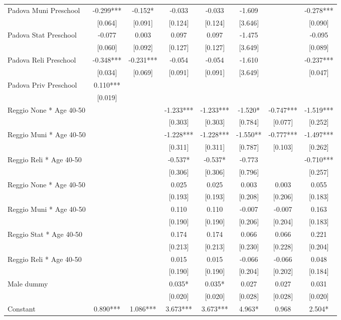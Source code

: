 \begin{tabular}{lccccccc}
Padova Muni Preschool & -0.299*** & -0.152* & -0.033 & -0.033 & -1.609 &  & -0.278*** \\
 & [0.064] & [0.091] & [0.124] & [0.124] & [3.646] &  & [0.090] \\
Padova Stat Preschool & -0.077 & 0.003 & 0.097 & 0.097 & -1.475 &  & -0.095 \\
 & [0.060] & [0.092] & [0.127] & [0.127] & [3.649] &  & [0.089] \\
Padova Reli Preschool & -0.348*** & -0.231*** & -0.054 & -0.054 & -1.610 &  & -0.237*** \\
 & [0.034] & [0.069] & [0.091] & [0.091] & [3.649] &  & [0.047] \\
Padova Priv Preschool & 0.110*** &  &  &  &  &  &  \\
 & [0.019] &  &  &  &  &  &  \\
Reggio None * Age 40-50 &  &  & -1.233*** & -1.233*** & -1.520* & -0.747*** & -1.519*** \\
 &  &  & [0.303] & [0.303] & [0.784] & [0.077] & [0.252] \\
Reggio Muni * Age 40-50 &  &  & -1.228*** & -1.228*** & -1.550** & -0.777*** & -1.497*** \\
 &  &  & [0.311] & [0.311] & [0.787] & [0.103] & [0.262] \\
Reggio Reli * Age 40-50 &  &  & -0.537* & -0.537* & -0.773 &  & -0.710*** \\
 &  &  & [0.306] & [0.306] & [0.796] &  & [0.257] \\
Reggio None * Age 40-50 &  &  & 0.025 & 0.025 & 0.003 & 0.003 & 0.055 \\
 &  &  & [0.193] & [0.193] & [0.208] & [0.206] & [0.183] \\
Reggio Muni * Age 40-50 &  &  & 0.110 & 0.110 & -0.007 & -0.007 & 0.163 \\
 &  &  & [0.190] & [0.190] & [0.206] & [0.204] & [0.183] \\
Reggio Stat * Age 40-50 &  &  & 0.174 & 0.174 & 0.066 & 0.066 & 0.221 \\
 &  &  & [0.213] & [0.213] & [0.230] & [0.228] & [0.204] \\
Reggio Reli * Age 40-50 &  &  & 0.015 & 0.015 & -0.066 & -0.066 & 0.048 \\
 &  &  & [0.190] & [0.190] & [0.204] & [0.202] & [0.184] \\
Male dummy &  &  & 0.035* & 0.035* & 0.027 & 0.027 & 0.031 \\
 &  &  & [0.020] & [0.020] & [0.028] & [0.028] & [0.020] \\
Constant & 0.890*** & 1.086*** & 3.673*** & 3.673*** & 4.963* & 0.968 & 2.504* \\

\end{tabular}
